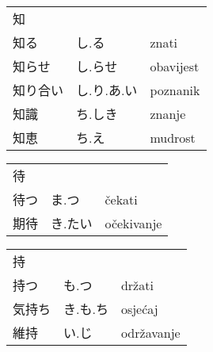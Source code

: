 

\newenvironment{dictentry}[1]{
	\begin{tabular}{p{2cm} p{3cm} p{10cm}}
		#1 &&\\
}{
	\end{tabular}
	\vspace{20pt}
}

\newcommand{\example}[3]{
	\hspace*{\fill}#1 & #2 & #3\\
}

\author{ロボット君}


\begin{dictentry}{知}
\example{知る}{し.る}{znati}
\example{知らせ}{し.らせ}{obavijest}
\example{知り合い}{し.り.あ.い}{poznanik}
\example{知識}{ち.しき}{znanje}
\example{知恵}{ち.え}{mudrost}
\end{dictentry}

\begin{dictentry}{待}
\example{待つ}{ま.つ}{čekati}
\example{期待}{き.たい}{očekivanje}
\end{dictentry}

\begin{dictentry}{持}
\example{持つ}{も.つ}{držati}
\example{気持ち}{き.も.ち}{osjećaj}
\example{維持}{い.じ}{održavanje}
\end{dictentry}

